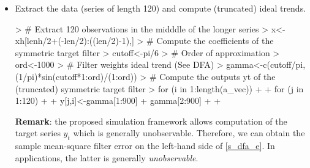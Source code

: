 \documentclass[a4paper]{book}
\begin{document}
\begin{enumerate}
\begin{itemize}
\item Extract the data (series of length 120) and compute (truncated) ideal trends. 
\begin{Schunk}
\begin{Sinput}
> # Extract 120 observations in the midddle of the longer series
> x<-xh[lenh/2+(-len/2):((len/2)-1),]
> # Compute the coefficients of the symmetric target filter
> cutoff<-pi/6
> # Order of approximation
> ord<-1000
> # Filter weights ideal trend (See DFA)
> gamma<-c(cutoff/pi,(1/pi)*sin(cutoff*1:ord)/(1:ord))
> # Compute the outputs yt of the (truncated) symmetric target filter
> for (i in 1:length(a_vec))
+ {
+   for (j in 1:120)
+   {
+     y[j,i]<-gamma[1:900]%
+     gamma[2:900]%
+   }
+ }
\end{Sinput}
\end{Schunk}
\textbf{Remark}: the proposed simulation framework allows computation of the target series $y_t$ which is generally unobservable. Therefore, we can obtain the sample mean-square filter error on the left-hand side of \ref{s_dfa_e}. In applications, the latter is generally \emph{unobservable}. 
\end{itemize}


\end{enumerate}
\end{document}

